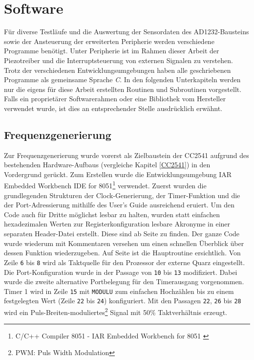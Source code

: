 \documentclass[12pt]{scrreprt} %
\begin{document}
\chapter{Software}
\label{Software}
Für diverse Testläufe und die Auswertung der Sensordaten des AD1232-Bausteins sowie der Ansteuerung der erweiterten Peripherie werden verschiedene Programme benötigt. Unter Peripherie ist im Rahmen dieser Arbeit der Piezotreiber und die Interruptsteuerung von externen Signalen zu verstehen. Trotz der verschiedenen Entwicklungsumgebungen haben alle geschriebenen Programme als gemeinsame Sprache \textit{C}. In den folgenden Unterkapiteln werden nur die eigens für diese Arbeit erstellten Routinen und Subroutinen vorgestellt. Falls ein proprietärer Softwarerahmen oder eine Bibliothek vom Hersteller verwendet wurde, ist dies an entsprechender Stelle ausdrücklich erwähnt.
\section{Frequenzgenerierung}
Zur Frequenzgenerierung wurde vorerst als Zielbaustein der CC2541 aufgrund des bestehenden Hardware-Aufbaus (vergleiche Kapitel \vref{CC2541}) in den Vordergrund gerückt. Zum Erstellen wurde die Entwicklungsumgebung IAR Embedded Workbench IDE for 8051\footnote{C/C++ Compiler 8051 - IAR Embedded Workbench for 8051 \citep{iar}} verwendet. Zuerst wurden die grundlegenden Strukturen der Clock-Generierung, der Timer-Funktion und die der Port-Adressierung mithilfe des User's Guide \citep{CC2541_full} ausreichend eruiert. Um den Code auch für Dritte möglichst lesbar zu halten, wurden statt einfachen hexadezimalen Werten zur Registerkonfiguration lesbare Akronyme in einer separaten Header-Datei erstellt. Diese sind ab Seite \pageref{CC2541_porting_defines}zu finden. Der ganze Code wurde wiederum mit Kommentaren versehen um einen schnellen Überblick über dessen Funktion wiederzugeben. Auf Seite \pageref{CC2541_main} ist die Hauptroutine ersichtlich. Von Zeile \texttt{6} bis \texttt{8} wird als Taktquelle für den Prozessor der externe Quarz eingestellt. Die Port-Konfiguration wurde in der Passage von \texttt{10} bis \texttt{13} modifiziert. Dabei wurde die zweite alternative Portbelegung für den Timerausgang vorgenommen. Timer 1 wird in Zeile \texttt{15} mit \texttt{MODULU} zum einfachen Hochzählen bis zu einem festgelegten Wert (Zeile \texttt{22} bis \texttt{24}) konfiguriert. Mit den Passagen \texttt{22}, \texttt{26} bis \texttt{28} wird ein Puls-Breiten-moduliertes\footnote{PWM: Puls Width Modulation} Signal mit 50\% Taktverhältnis erzeugt. 
\newpage

\newpage

\end{document}
